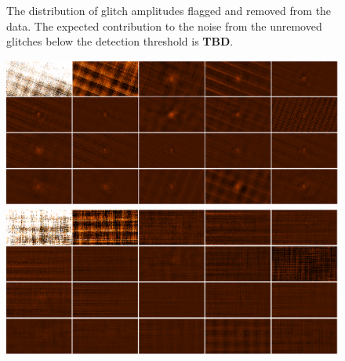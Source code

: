 \documentclass[12pt,preprint]{aastex}
\newcommand{\TBD}{{\bf TBD}}
\def\Figure#1#2#3#4{
\begin{figure}[htb]
\epsscale{#4}
\plotone{#1}
\caption{#2}
\label{#3}
\end{figure}
}
\def\FigureTwo#1#2#3#4#5{
\begin{figure}[htb]
\epsscale{#5}
\plottwo{#1}{#2}
\caption{#3}
\label{#4}
\end{figure}
}
\begin{document}
%
\Figure{crs}{The distribution of glitch amplitudes flagged and removed
from the data.  The expected contribution to the noise from the
unremoved glitches below the detection threshold is
\TBD.}{fig:GlitchDistribution}{1.0}

\begin{figure}
  \begin{minipage}{6.5in}
    \begin{center}
      \includegraphics[scale=0.8]{eachpca}
    \end{center}
  \end{minipage}
\vspace{0.25in}
  \begin{minipage}{6.5in}
    \begin{center}
      \includegraphics[scale=0.8]{eachpca_20iters}
    \end{center}
  \end{minipage}

\end{figure}
\end{document}
